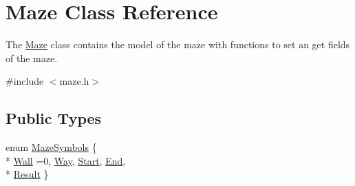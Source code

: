 \hypertarget{class_maze}{\section{Maze Class Reference}
\label{class_maze}
}


The \hyperlink{class_maze}{Maze} class contains the model of the maze with functions to set an get fields of the maze.  




{\ttfamily \#include $<$maze.\-h$>$}

\subsection*{Public Types}
\begin{DoxyCompactItemize}
\item 
enum \hyperlink{class_maze_a7a19b706242876f2c597033b3374e7fa}{Maze\-Symbols} \{ \\*
\hyperlink{class_maze_a7a19b706242876f2c597033b3374e7faa4b3509571b07cde9b535f8358157d676}{Wall} =0, 
\hyperlink{class_maze_a7a19b706242876f2c597033b3374e7faac7cbc8392fac9738ef3dac458865d3eb}{Way}, 
\hyperlink{class_maze_a7a19b706242876f2c597033b3374e7faaf68b987d7cff7378d76e7b4159aeea6d}{Start}, 
\hyperlink{class_maze_a7a19b706242876f2c597033b3374e7faa752d570bd64e08ce1c7f358dd3cc6969}{End}, 
\\*
\hyperlink{class_maze_a7a19b706242876f2c597033b3374e7faaa87a698c7829b0c1f1b89cc93a44f2bc}{Result}
 \}
\end{DoxyCompactItemize}

